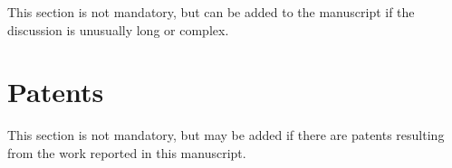 \documentclass[journal,article,submit,pdftex,moreauthors]{Definitions/mdpi}
\begin{document}
This section is not mandatory, but can be added to the manuscript if the discussion is unusually long or complex.

\section{Patents}

This section is not mandatory, but may be added if there are patents resulting from the work reported in this manuscript.

\vspace{6pt} 




\end{document}
